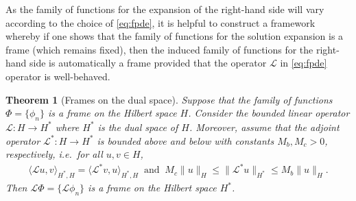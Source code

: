 \documentclass[10pt,a4paper]{article}
\newtheorem{theorem}{Theorem}[section]
\numberwithin{equation}{section}
\begin{document}
As the family of functions for the expansion of the right-hand side will vary according to the choice of \cref{eq:fpde}, it is helpful to construct a framework whereby if one shows that the family of functions for the solution expansion is a frame (which remains fixed), then the induced family of functions for the right-hand  side  is automatically a frame provided that the operator $\mathcal{L}$ in \cref{eq:fpde} operator is well-behaved. 
\begin{theorem}[Frames on the dual space]
\label{lem:range}
Suppose that the family of functions $\Phi = \{\phi_n\}$ is a frame on the Hilbert space $H$. Consider the bounded linear operator $\mathcal{L} : H \to  H^*$ where $H^*$ is the dual space of $H$. Moreover, assume that the adjoint operator   $\mathcal{L}^* : H \to H^*$ is bounded above and below with constants $M_b, M_c > 0$, respectively, i.e.~for all $u, v \in H$,
\begin{align}
\langle \mathcal{L} u, v \rangle_{H^*, H} = \langle \mathcal{L}^* v, u \rangle_{H^*, H} \;\;
\text{and} \;\;
M_c \| u \|_H \leq \| \mathcal{L}^* u \|_{H^*} \leq M_b \| u \|_{H}.
\end{align} 
Then $\mathcal{L}{\Phi} = \{\mathcal{L} \phi_n\}$ is a frame on the Hilbert space $H^*$.
\end{theorem} 
\end{document}
